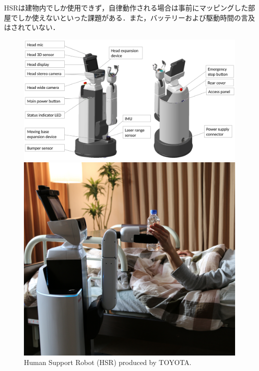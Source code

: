HSRは建物内でしか使用できず，自律動作される場合は事前にマッピングした部屋でしか使えないといった課題がある．また，バッテリーおよび駆動時間の言及はされていない．
\begin{figure}[H]
    \centering
    \begin{minipage}{0.6\hsize}
        \centering
        \includegraphics[width=\linewidth]{figure/chapter1/HSR_paper-2}
    \end{minipage}
    \begin{minipage}{0.39\hsize}
        \centering
        \includegraphics[width=\linewidth]{figure/chapter1/HSR_site-2}
    \end{minipage}
    \caption[Human Support Robot (HSR) produced by TOYOTA.]{Human Support Robot (HSR) produced by TOYOTA\cite{HSR201, HSRサイト}.}
    \label{fig:HSR}
\end{figure}

